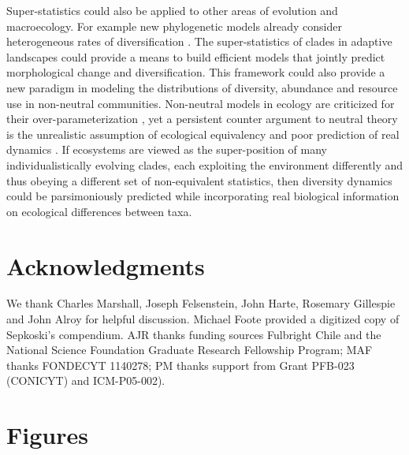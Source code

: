 \documentclass[11pt]{article}
\begin{document}
Super-statistics could also be applied to other areas of evolution and
macroecology.  For example new phylogenetic models already consider
heterogeneous rates of diversification
\citep[e.g.][]{rabosky2006laser}. The super-statistics of clades in
adaptive landscapes could provide a means to build efficient models
that jointly predict morphological change and diversification. This
framework could also provide a new paradigm in modeling the
distributions of diversity, abundance and resource use in non-neutral
communities. Non-neutral models in ecology are criticized for their
over-parameterization \citep{rosindell2011TREE}, yet a persistent
counter argument to neutral theory \citep{hubbell2001} is the
unrealistic assumption of ecological equivalency
\citep{chave2004neutral} and poor prediction of real dynamics
\citep{ricklefs2006neutral}. If ecosystems are viewed as the
super-position of many individualistically evolving clades, each
exploiting the environment differently and thus obeying a different
set of non-equivalent statistics, then diversity dynamics could be
parsimoniously predicted while incorporating real biological
information on ecological differences between taxa.


\section*{Acknowledgments}
We thank Charles Marshall, Joseph Felsenstein, John Harte, Rosemary
Gillespie and John Alroy for helpful discussion. Michael Foote
provided a digitized copy of Sepkoski's compendium. AJR thanks funding
sources Fulbright Chile and the National Science Foundation Graduate
Research Fellowship Program; MAF thanks FONDECYT 1140278; PM thanks
support from Grant PFB-023 (CONICYT) and ICM-P05-002).

%
%

\clearpage

\section*{Figures}
\end{document}
